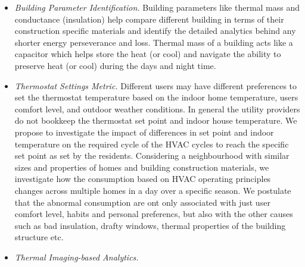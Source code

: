 \documentclass{sig-alternate}
\begin{document}
\begin{itemize}
  \item \emph{Building Parameter Identification.} Building parameters like thermal mass and conductance (insulation) help compare different building in terms of their construction specific materials and identify the detailed analytics behind any shorter energy perseverance and loss. Thermal mass of a building acts like a capacitor which helps store the heat (or cool) and navigate the ability to preserve heat (or cool) during the days and night time. %
  \item \emph{Thermostat Settings Metric.} Different users may have different preferences to set the thermostat temperature based on the indoor home temperature, users comfort level, and outdoor weather conditions. In general the utility providers do not bookkeep the thermostat set point and indoor house temperature. We propose to investigate the impact of differences in set point and indoor temperature on the required cycle of the HVAC cycles to reach the specific set point as set by the residents. Considering a neighbourhood with similar sizes and properties of homes and building construction materials, we investigate how the consumption based on HVAC operating principles changes across multiple homes in a day over a specific season. We postulate that the abnormal consumption are ont only associated with just user comfort level, habits and personal preferencs, but also with the other causes such as bad insulation, drafty windows, thermal properties of the building structure etc.
  \item \emph{Thermal Imaging-based Analytics.}
\end{itemize}
\end{document}
